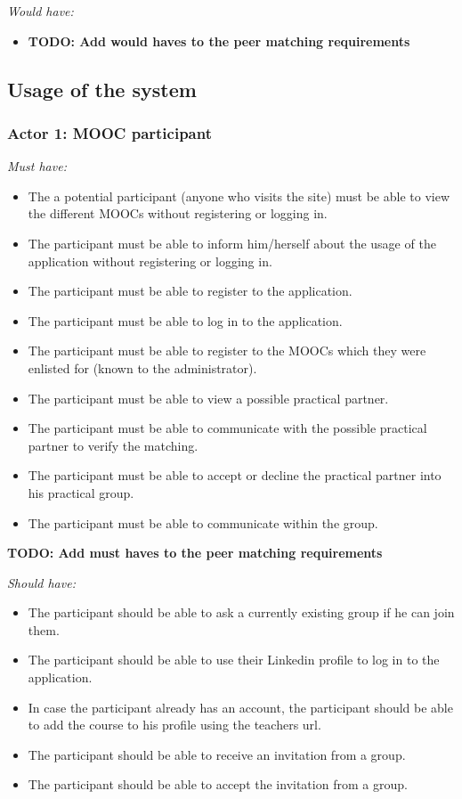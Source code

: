 \documentclass[]{article}
\newcommand{\TODO}[1]{{\color{red}\textbf{TODO: #1}}}
\newcommand{\reqr}[1]{{\noindent\emph{#1:}}}
\begin{document}
\reqr{Would have}
\begin{itemize}
\item \TODO{Add would haves to the peer matching requirements}
\end{itemize}

\subsection{Usage of the system}

\subsubsection{Actor 1: MOOC participant}

\reqr{Must have}
\begin{itemize}
\item The a potential participant (anyone who visits the site) must be able to view the different MOOCs without registering or logging in.
\item The participant must be able to inform him/herself about the usage of the application without registering or logging in.
\item The participant must be able to register to the application.
\item The participant must be able to log in to the application.
\item The participant must be able to register to the MOOCs which they were enlisted for (known to the administrator).
\item The participant must be able to view a possible practical partner.
\item The participant must be able to communicate with the possible practical partner to verify the matching.
\item The participant must be able to accept or decline the practical partner into his practical group.
\item The participant must be able to communicate within the group.
\end{itemize}
\TODO{Add must haves to the peer matching requirements}

\reqr{Should have}
\begin{itemize}
\item The participant should be able to ask a currently existing group if he can join them.
\item The participant should be able to use their Linkedin profile to log in to the application.
\item In case the participant already has an account, the participant should be able to add the course to his profile using the teachers url.
\item The participant should be able to receive an invitation from a group.
\item The participant should be able to accept the invitation from a group.
\end{itemize}
\end{document}
